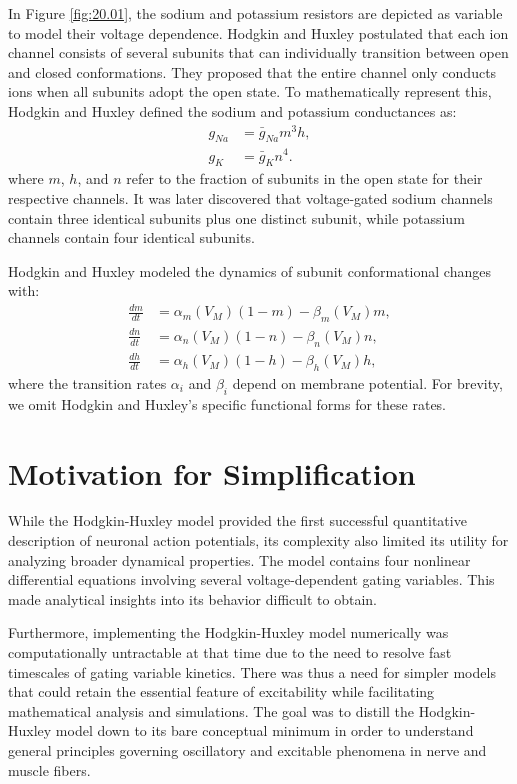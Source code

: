In Figure \ref{fig:20.01}, the sodium and potassium resistors are depicted as variable to model their voltage dependence. Hodgkin and Huxley postulated that each ion channel consists of several subunits that can individually transition between open and closed conformations. They proposed that the entire channel only conducts ions when all subunits adopt the open state. To mathematically represent this, Hodgkin and Huxley defined the sodium and potassium conductances as:
\begin{align*}
g_{Na} & = \bar{g}_{Na} m^3 h, \\
g_K & = \bar{g}_K n^4.
\end{align*}
where $m$, $h$, and $n$ refer to the fraction of subunits in the open state for their respective channels. It was later discovered that voltage-gated sodium channels contain three identical subunits plus one distinct subunit, while potassium channels contain four identical subunits.

Hodgkin and Huxley modeled the dynamics of subunit conformational changes with:
\begin{align*}
\frac{dm}{dt} &= \alpha_m(V_M) (1-m) - \beta_m(V_M) m, \\
\frac{dn}{dt} &= \alpha_n(V_M) (1-n) - \beta_n(V_M) n, \\
\frac{dh}{dt} &= \alpha_h(V_M) (1-h) - \beta_h(V_M) h,
\end{align*}
where the transition rates $\alpha_i$ and $\beta_i$ depend on membrane potential. For brevity, we omit Hodgkin and Huxley's specific functional forms for these rates.

\section{Motivation for Simplification}

While the Hodgkin-Huxley model provided the first successful quantitative description of neuronal action potentials, its complexity also limited its utility for analyzing broader dynamical properties. The model contains four nonlinear differential equations involving several voltage-dependent gating variables. This made analytical insights into its behavior difficult to obtain.

Furthermore, implementing the Hodgkin-Huxley model numerically was computationally untractable at that time due to the need to resolve fast timescales of gating variable kinetics. There was thus a need for simpler models that could retain the essential feature of excitability while facilitating mathematical analysis and simulations. The goal was to distill the Hodgkin-Huxley model down to its bare conceptual minimum in order to understand general principles governing oscillatory and excitable phenomena in nerve and muscle fibers.

